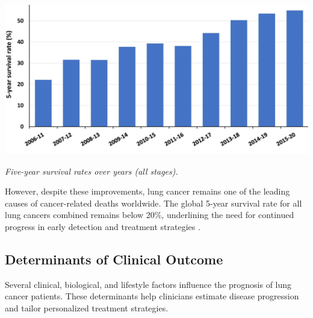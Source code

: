 \vspace{1em}
\begin{center}
    \includegraphics[width=1.00\textwidth]{../assets/05-prognosis/survival-rates.jpg}

    \small\textit{Five-year survival rates over years (all stages). \cite{osarogiagbon2023stage}}
\end{center}
\vspace{1em}

However, despite these improvements, lung cancer remains one of the leading causes of cancer-related 
deaths worldwide. The global 5-year survival rate for all lung cancers combined remains below 20\%, 
underlining the need for continued progress in early detection and treatment strategies 
\cite{bray2018global}.


\subsection{Determinants of Clinical Outcome}

Several clinical, biological, and lifestyle factors influence the prognosis of lung cancer patients. 
These determinants help clinicians estimate disease progression and tailor personalized treatment 
strategies.

